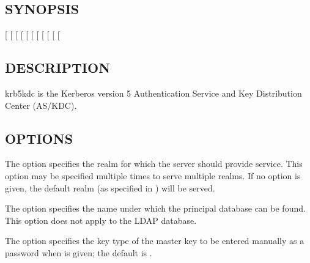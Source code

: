\documentclass[letterpaper,10pt,english]{sphinxmanual}
\begin{document}
\subsection{SYNOPSIS}
\label{\detokenize{admin/admin_commands/krb5kdc:synopsis}}
\sphinxAtStartPar
{}
{[} \sphinxstyleemphasis{db\_args}{]}
{[} \sphinxstyleemphasis{dbname}{]}
{[} \sphinxstyleemphasis{keytype}{]}
{[} \sphinxstyleemphasis{mkeyname}{]}
{[} \sphinxstyleemphasis{portnum}{]}
{[}\sphinxstylestrong{\sphinxhyphen{}m}{]}
{[} \sphinxstyleemphasis{realm}{]}
{[}\sphinxstylestrong{\sphinxhyphen{}n}{]}
{[} \sphinxstyleemphasis{numworkers}{]}
{[} \sphinxstyleemphasis{pid\_file}{]}
{[} \sphinxstyleemphasis{time\_offset}{]}


\subsection{DESCRIPTION}
\label{\detokenize{admin/admin_commands/krb5kdc:description}}
\sphinxAtStartPar
krb5kdc is the Kerberos version 5 Authentication Service and Key
Distribution Center (AS/KDC).


\subsection{OPTIONS}
\label{\detokenize{admin/admin_commands/krb5kdc:options}}
\sphinxAtStartPar
The   option specifies the realm for which the server
should provide service.  This option may be specified multiple times
to serve multiple realms.  If no  option is given, the default
realm (as specified in {\hyperref[\detokenize{admin/conf_files/krb5_conf:krb5-conf-5}]{}}) will be served.

\sphinxAtStartPar
The   option specifies the name under which the
principal database can be found.  This option does not apply to the
LDAP database.

\sphinxAtStartPar
The   option specifies the key type of the master key
to be entered manually as a password when  is given; the default
is .
\end{document}
